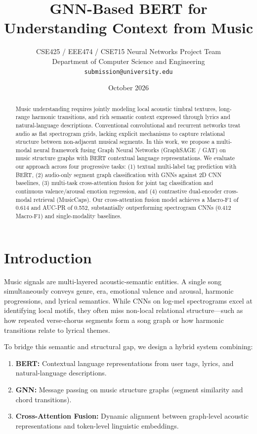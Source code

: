 \documentclass{article}
\title{GNN-Based BERT for Understanding Context from Music}
\author{
  CSE425 / EEE474 / CSE715 Neural Networks Project Team \\
  Department of Computer Science and Engineering \\
  \texttt{submission@university.edu}
}
\date{October 2026}
\begin{document}
\maketitle

\begin{abstract}
Music understanding requires jointly modeling local acoustic timbral textures, long-range harmonic transitions, and rich semantic context expressed through lyrics and natural-language descriptions. Conventional convolutional and recurrent networks treat audio as flat spectrogram grids, lacking explicit mechanisms to capture relational structure between non-adjacent musical segments. In this work, we propose a multi-modal neural framework fusing Graph Neural Networks (GraphSAGE / GAT) on music structure graphs with BERT contextual language representations. We evaluate our approach across four progressive tasks: (1) textual multi-label tag prediction with BERT, (2) audio-only segment graph classification with GNNs against 2D CNN baselines, (3) multi-task cross-attention fusion for joint tag classification and continuous valence/arousal emotion regression, and (4) contrastive dual-encoder cross-modal retrieval (MusicCaps). Our cross-attention fusion model achieves a Macro-F1 of 0.614 and AUC-PR of 0.552, substantially outperforming spectrogram CNNs (0.412 Macro-F1) and single-modality baselines.
\end{abstract}

\section{Introduction}
Music signals are multi-layered acoustic-semantic entities. A single song simultaneously conveys genre, era, emotional valence and arousal, harmonic progressions, and lyrical semantics. While CNNs on log-mel spectrograms excel at identifying local motifs, they often miss non-local relational structure—such as how repeated verse-chorus segments form a song graph or how harmonic transitions relate to lyrical themes. 

To bridge this semantic and structural gap, we design a hybrid system combining:
\begin{enumerate}
    \item \textbf{BERT:} Contextual language representations from user tags, lyrics, and natural-language descriptions.
    \item \textbf{GNN:} Message passing on music structure graphs (segment similarity and chord transitions).
    \item \textbf{Cross-Attention Fusion:} Dynamic alignment between graph-level acoustic representations and token-level linguistic embeddings.
\end{enumerate}
\end{document}
